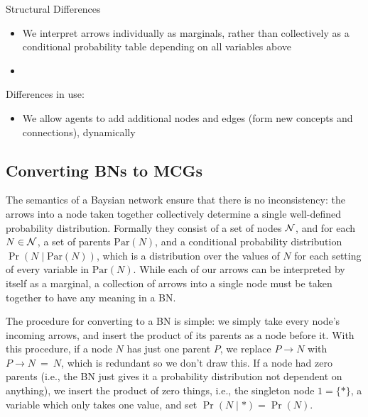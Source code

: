 \documentclass{article}
\begin{document}
	
	Structural Differences
	\begin{itemize}[nosep]
		\item We interpret arrows individually as marginals, rather than collectively as a conditional probability table depending on all variables above
		\item 
	\end{itemize}
	
	Differences in use:
	\begin{itemize}[nosep]
		\item We allow agents to add additional nodes and edges (form new concepts and connections), dynamically
	\end{itemize}
	
	\subsection{Converting BNs to MCGs}
	
	\label{sec:convert2bn}
	The semantics of a Baysian network ensure that there is no inconsistency: the arrows into a node taken together collectively determine a single well-defined probability distribution. Formally they consist of a set of nodes $\cal N$, and for each $N \in \cal N$, a set of parents $\mathrm{Par}(N)$, and a conditional probability distribution $\Pr( N \mid \mathrm{Par}(N))$, which is a distribution over the values of $N$ for each setting of every variable in $\mathrm{Par}(N)$. While each of our arrows can be interpreted by itself as a marginal, a collection of arrows into a single node must be taken together to have any meaning in a BN. 
	
	The procedure for converting to a BN is simple: we simply take every node's incoming arrows, and insert the product of its parents as a node before it. With this procedure, if a node $N$ has just one parent $P$, we replace $P \to N$ with $P \to N ~=~ N$, which is redundant so we don't draw this. If a node had zero parents (i.e., the BN just gives it a probability distribution not dependent on anything), we insert the product of zero things, i.e., the singleton node $1 = \{*\}$, a variable which only takes one value, and set $\Pr(N \mid *) = \Pr(N)$. 
	
\end{document}
